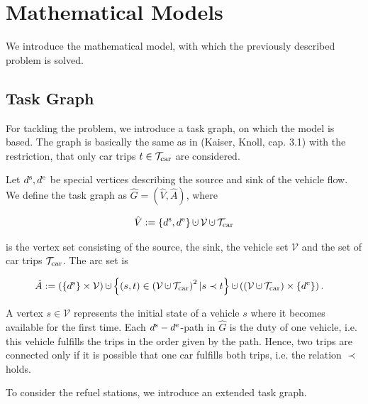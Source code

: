 \section{Mathematical Models}

We introduce the mathematical model, with which the previously described problem is solved.

\subsection{Task Graph}

For tackling the problem, we introduce a task graph, on which the model is based. The graph is basically the same as in (Kaiser, Knoll, cap. 3.1) with the restriction, that only car trips $t\in\mathcal{T}_{\operatorname{car}}$ are considered.

\begin{definition}

Let $d^{\operatorname{s}},d^{\operatorname{e}}$ be special vertices describing the source and sink of the vehicle flow. We define the task graph as $\hat{G}=(\hat{V},\hat{A})$, where

\begin{align*}
	\hat{V}:=\left\{\ds,\de\right\}\cupdot\mathcal{V}\cupdot\Tcar
\end{align*}

is the vertex set consisting of the source, the sink, the vehicle set $\mathcal{V}$ and the set of car trips $\mathcal{T}_{\operatorname{car}}$. The arc set is

\begin{align*}
	\hat{A} & :=\left(\left\{\ds\right\}\times\mathcal{V}\right)\cupdot\left\{(s,t)\in\left(\mathcal{V}\cupdot\Tcar\right)^2|s\prec t\right\}\cupdot\left(\left(\mathcal{V}\cupdot\Tcar\right)\times\left\{\de\right\}\right).
\end{align*}

\end{definition}

A vertex $s\in\mathcal{V}$ represents the initial state of a vehicle $s$ where it becomes available for the first time. Each $d^{\operatorname{s}} -d^{\operatorname{e}}$-path in $\hat{G}$ is the duty of one vehicle, i.e. this vehicle fulfills the trips in the order given by the path. Hence, two trips are connected only if it is possible that one car fulfills both trips, i.e. the relation $\prec$ holds.

To consider the refuel stations, we introduce an extended task graph.

